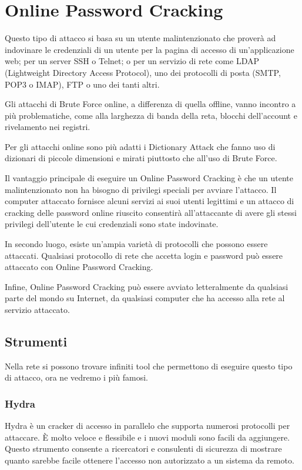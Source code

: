 \chapter{Online Password Cracking}

Questo tipo di attacco si basa su un utente malintenzionato che proverà ad indovinare le credenziali di un utente per la pagina di accesso di un'applicazione web; per un server SSH o Telnet; o per un servizio di rete come LDAP (Lightweight Directory Access Protocol), uno dei protocolli di posta (SMTP, POP3 o IMAP), FTP o uno dei tanti altri.

Gli attacchi di Brute Force online, a differenza di quella offline, vanno incontro a più problematiche, come alla larghezza di banda della reta, blocchi dell'account e rivelamento nei registri.

Per gli attacchi online sono più adatti i Dictionary Attack che fanno uso di dizionari di piccole dimensioni e mirati piuttosto che all'uso di Brute Force.

Il vantaggio principale di eseguire un Online Password Cracking è che un utente malintenzionato non ha bisogno di privilegi speciali per avviare l'attacco. Il computer attaccato fornisce alcuni servizi ai suoi utenti legittimi e un attacco di cracking delle password online riuscito consentirà all'attaccante di avere gli stessi privilegi dell'utente le cui credenziali sono state indovinate.

In secondo luogo, esiste un'ampia varietà di protocolli che possono essere attaccati. Qualsiasi protocollo di rete che accetta login e password può essere attaccato con Online Password Cracking.

Infine, Online Password Cracking può essere avviato letteralmente da qualsiasi parte del mondo su Internet, da qualsiasi computer che ha accesso alla rete al servizio attaccato.

\section{Strumenti}

Nella rete si possono trovare infiniti tool che permettono di eseguire questo tipo di attacco, ora ne vedremo i più famosi.

\subsection{Hydra}

Hydra è un cracker di accesso in parallelo che supporta numerosi protocolli per attaccare. È molto veloce e flessibile e i nuovi moduli sono facili da aggiungere. Questo strumento consente a ricercatori e consulenti di sicurezza di mostrare quanto sarebbe facile ottenere l'accesso non autorizzato a un sistema da remoto.

